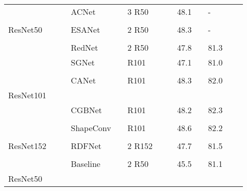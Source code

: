 \documentclass{aims}
\numberwithin{equation}{section}
\begin{document}
\begin{table}[t]
\begin{tabular}{lllllllllllll}
    \midrule
          &       &       & ACNet\cite{hu2019acnet} &       &        3   R50 &       &       & 48.1  &       &        - \\
          &       &       &       &       &       &       &       &       &       &       &         \\
    ResNet50 &       &       & ESANet\cite{seichter2021efficient} &       &        2   R50 &       &       & 48.3  &       &        - \\
          &       &       &       &       &       &       &       &       &       &       &         \\
          &       &       & RedNet\cite{jiang2018rednet} &       &        2   R50 &       &       & 47.8  &       &        81.3 \\
    \midrule
          &       &       & SGNet\cite{chen2021spatial} &       &       R101  &       &       & 47.1  &       &        81.0 \\
          &       &       &       &       &       &       &       &       &       &       &         \\
          &       &       & CANet\cite{tang2021attention} &       &        R101  &       &       & 48.3  &       &        82.0 \\
    ResNet101 &       &       &       &       &       &       &       &       &       &       &         \\
          &       &       & CGBNet\cite{ding2020semantic} &       &        R101  &       &       & 48.2  &       &        82.3 \\
          &       &       &       &       &       &       &       &       &       &       &         \\
          &       &       & ShapeConv\cite{cao2021shapeconv} &       &        R101  &       &       & 48.6  &       &        82.2 \\
    \midrule
          &       &       &       &       &       &       &       &       &       &       &         \\
    ResNet152 &       &       & RDFNet\cite{park2017rdfnet} &       &        2   R152 &       &       & 47.7  &       &        81.5 \\
          &       &       &       &       &       &       &       &       &       &       &         \\
          &       &       & Baseline &       &        2   R50 &       &       & 45.5  &       &        81.1 \\
    ResNet50 &       &       &       &       &       &       &       &       &       &       &         \\

\end{tabular}
\end{table}
\end{document}
